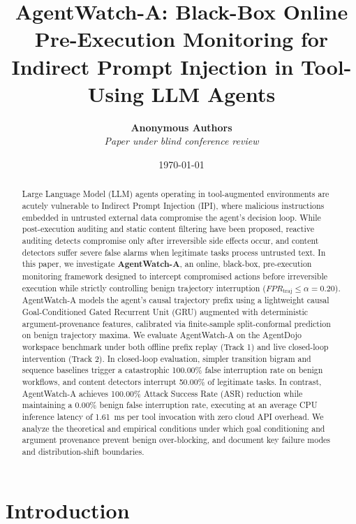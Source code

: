 \documentclass[11pt,a4paper]{article}
\title{\textbf{AgentWatch-A: Black-Box Online Pre-Execution Monitoring for Indirect Prompt Injection in Tool-Using LLM Agents}}
\author{
  \textbf{Anonymous Authors}\\
  \textit{Paper under blind conference review}
}
\date{\today}
\begin{document}
\maketitle

\begin{abstract}
Large Language Model (LLM) agents operating in tool-augmented environments are acutely vulnerable to Indirect Prompt Injection (IPI), where malicious instructions embedded in untrusted external data compromise the agent's decision loop. While post-execution auditing and static content filtering have been proposed, reactive auditing detects compromise only after irreversible side effects occur, and content detectors suffer severe false alarms when legitimate tasks process untrusted text. In this paper, we investigate \textbf{AgentWatch-A}, an online, black-box, pre-execution monitoring framework designed to intercept compromised actions before irreversible execution while strictly controlling benign trajectory interruption ($FPR_{\text{traj}} \le \alpha = 0.20$). AgentWatch-A models the agent's causal trajectory prefix using a lightweight causal Goal-Conditioned Gated Recurrent Unit (GRU) augmented with deterministic argument-provenance features, calibrated via finite-sample split-conformal prediction on benign trajectory maxima. We evaluate AgentWatch-A on the AgentDojo workspace benchmark under both offline prefix replay (Track 1) and live closed-loop intervention (Track 2). In closed-loop evaluation, simpler transition bigram and sequence baselines trigger a catastrophic 100.00\% false interruption rate on benign workflows, and content detectors interrupt 50.00\% of legitimate tasks. In contrast, AgentWatch-A achieves 100.00\% Attack Success Rate (ASR) reduction while maintaining a 0.00\% benign false interruption rate, executing at an average CPU inference latency of 1.61~ms per tool invocation with zero cloud API overhead. We analyze the theoretical and empirical conditions under which goal conditioning and argument provenance prevent benign over-blocking, and document key failure modes and distribution-shift boundaries.
\end{abstract}

\section{Introduction}
\label{sec:intro}
\end{document}
